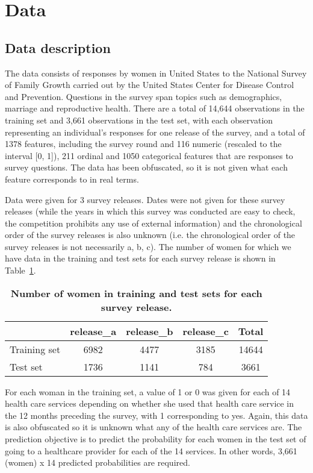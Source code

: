 \documentclass{article}\usepackage[]{graphicx}\usepackage[]{color}
\begin{document}
\section{Data}
\label{sec:data}

\subsection{Data description}
The data consists of responses by women in United States to the National Survey of Family Growth carried out by the United States Center for Disease Control and Prevention. Questions in the survey span topics such as demographics, marriage and reproductive health. There are a total of 14,644 observations in the training set and 3,661 observations in the test set, with each observation representing an individual’s responses for one release of the survey, and a total of 1378 features, including the survey round and 116 numeric (rescaled to the interval [0, 1]), 211 ordinal and 1050 categorical features that are responses to survey questions. The data has been obfuscated, so it is not given what each feature corresponds to in real terms.

Data were given for 3 survey releases. Dates were not given for these survey releases (while the years in which this survey was conducted are easy to check, the competition prohibits any use of external information) and the chronological order of the survey releases is also unknown (i.e. the chronological order of the survey releases is not necessarily a, b, c). The number of women for which we have data in the training and test sets for each survey release is shown in Table~\ref{tab-num-women}.

\begin{table}[ht]
\centering
\begin{tabular}{@{}|l|c|c|c|c|@{}}
\hline
& release\_a & release\_b & release\_c & Total \\ 
\hline
Training set & 6982 & 4477 & 3185 & 14644\\ 
Test set & 1736 & 1141 & 784 & 3661\\ 
\hline
\end{tabular}
\caption{\textbf{Number of women in training and test sets for each survey release.}} 
\label{tab-num-women}
\end{table}

For each woman in the training set, a value of 1 or 0 was given for each of 14 health care services depending on whether she used that health care service in the 12 months preceding the survey, with 1 corresponding to yes. Again, this data is also obfuscated so it is unknown what any of the health care services are. The prediction objective is to predict the probability for each women in the test set of going to a healthcare provider for each of the 14 services. In other words, 3,661 (women) x 14 predicted probabilities are required.
\end{document}
